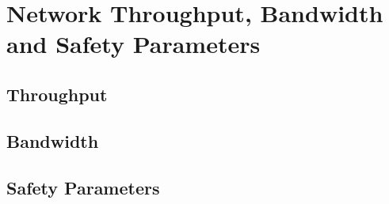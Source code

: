 \section{Network Throughput, Bandwidth and Safety Parameters}
\subsection{Throughput}

\subsection{Bandwidth}

\subsection{Safety Parameters}
